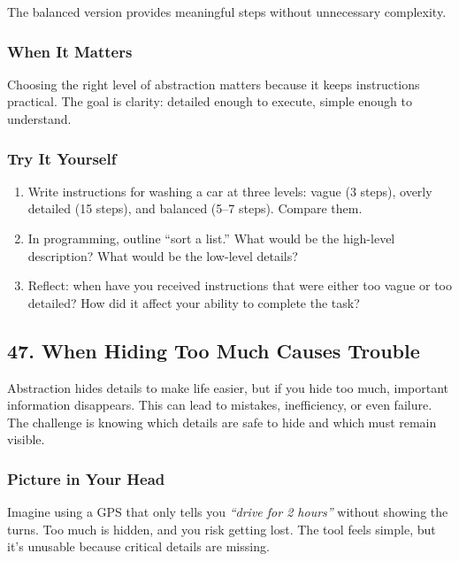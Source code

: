 \documentclass[
  letterpaper,
  DIV=11,
  numbers=noendperiod]{scrreprt}
\providecommand{\tightlist}{%
  \setlength{\itemsep}{0pt}\setlength{\parskip}{0pt}}
\begin{document}
The balanced version provides meaningful steps without unnecessary
complexity.

\subsubsection{When It Matters}\label{when-it-matters-43}

Choosing the right level of abstraction matters because it keeps
instructions practical. The goal is clarity: detailed enough to execute,
simple enough to understand.

\subsubsection{Try It Yourself}\label{try-it-yourself-45}

\begin{enumerate}
\def\labelenumi{\arabic{enumi}.}
\tightlist
\item
  Write instructions for washing a car at three levels: vague (3 steps),
  overly detailed (15 steps), and balanced (5--7 steps). Compare them.
\item
  In programming, outline ``sort a list.'' What would be the high-level
  description? What would be the low-level details?
\item
  Reflect: when have you received instructions that were either too
  vague or too detailed? How did it affect your ability to complete the
  task?
\end{enumerate}

\subsection{47. When Hiding Too Much Causes
Trouble}\label{when-hiding-too-much-causes-trouble}

Abstraction hides details to make life easier, but if you hide too much,
important information disappears. This can lead to mistakes,
inefficiency, or even failure. The challenge is knowing which details
are safe to hide and which must remain visible.

\subsubsection{Picture in Your Head}\label{picture-in-your-head-46}

Imagine using a GPS that only tells you \emph{``drive for 2 hours''}
without showing the turns. Too much is hidden, and you risk getting
lost. The tool feels simple, but it's unusable because critical details
are missing.
\end{document}
